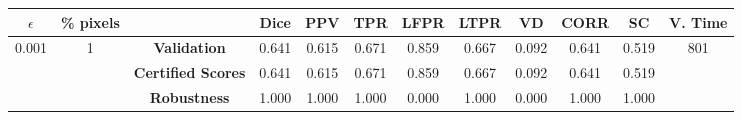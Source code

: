 \begin{longtable}{ c  c | c | c  c  c  c  c  c  c c c}
\toprule \textbf{$\epsilon$} & \textbf{\% pixels} & & \textbf{Dice} & \textbf{PPV} & \textbf{TPR} & \textbf{LFPR} & \textbf{LTPR} & \textbf{VD} & \textbf{CORR} & \textbf{SC} & \textbf{V. Time} \\
\midrule 
\multirow{3}{*}{0.001}  & \multirow{3}{*}{1} &\textbf{Validation} & 0.641 & 0.615 & 0.671 & 0.859 & 0.667 & 0.092 & 0.641 & 0.519 & \multirow{3}{*}{801} \\
 & & \textbf{Certified Scores} & 0.641 & 0.615 & 0.671 & 0.859 & 0.667 & 0.092 & 0.641 & 0.519 & \\
& & \textbf{Robustness} & 1.000 & 1.000 & 1.000 & 0.000 & 1.000 & 0.000 & 1.000 & 1.000 & \\
\end{longtable}